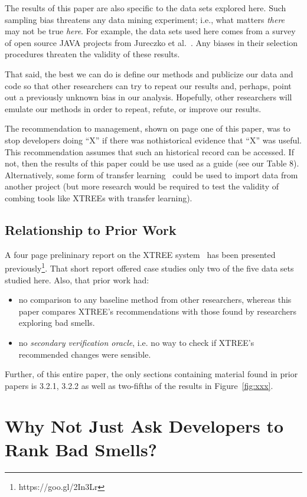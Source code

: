 \documentclass[twocolumn,5p]{elsarticle}
\newcommand{\bi}{\begin{itemize}[leftmargin=0.4cm]}
\newcommand{\ei}{\end{itemize}}
\newcommand{\fig}[1]{Figure~\ref{fig:#1}}
\theoremstyle{break}
\begin{document}
The results of this paper are also specific to the data sets explored here.
Such sampling bias threatens any data mining experiment; i.e., what matters
{\em there} may not be true {\em here}. For example, the data sets used here comes from a survey of
open source JAVA projects from Jureczko et al.~\cite{jureczko10}. Any biases in their selection procedures
threaten the validity of these results. 

That said,
the best we can do is define our methods and publicize our data and code so that other researchers can
try to repeat our results and, perhaps, point out a previously unknown bias
in our analysis. Hopefully, other researchers will emulate our methods in
order to repeat, refute, or improve our results. 

The recommendation to management, shown on page one of this paper,  was to stop developers doing ``X'' if there was
nothistorical evidence that ``X'' was useful. 
This recommendation assumes that such an  historical record can be accessed. If not,  then the results of this paper could be use used as a guide (see our Table 8). Alternatively, some form of transfer learning~\cite{Nam15,Jing15,krishna16} could be used to import data from another project (but more research would be required to test the validity of combing tools like XTREEs with transfer learning). 
  

  
  
  \subsection{Relationship to Prior Work }
A four page prelininary report on the XTREE system~\cite{krishna2015actionable} has been presented previously\footnote{https://goo.gl/2In3Lr}. That short report offered case studies only two  of
the five data sets studied here. Also, that prior work had:
\bi
\item
no comparison to any baseline
method from other researchers, whereas this paper compares XTREE's recommendations
with those found by researchers exploring bad smells.
\item
no {\em secondary verification oracle}, i.e. no way to check if XTREE's recommended changes were sensible.
\ei
Further, of this entire paper, the only sections containing material
found in prior papers is 3.2.1, 3.2.2 as well as two-fifths of the results in \fig{xxx}. 



\section{Why Not Just Ask Developers to Rank Bad Smells?}\label{sect:prelim}
\end{document}
